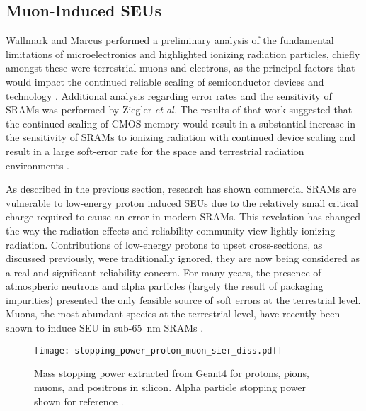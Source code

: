 \subsection{Muon-Induced SEUs} %
\label{sub:muon_induced_seus}
Wallmark and Marcus performed a preliminary analysis of the fundamental limitations of microelectronics and highlighted ionizing radiation particles, chiefly amongst these were terrestrial muons and electrons, as the principal factors that would impact the continued reliable scaling of semiconductor devices and technology \cite{Wallmark:1962vn}.
Additional analysis regarding error rates and the sensitivity of SRAMs was performed by Ziegler \emph{et al.}
The results of that work suggested that the continued scaling of CMOS memory would result in a substantial increase in the sensitivity of SRAMs to ionizing radiation with continued device scaling and result in a large soft-error rate for the space and terrestrial radiation environments \cite{Ziegler:1979vh}.

As described in the previous section, research has shown commercial SRAMs are vulnerable to low-energy proton induced SEUs due to the relatively small critical charge required to cause an error in modern SRAMs.
This revelation has changed the way the radiation effects and reliability community view lightly ionizing radiation.
Contributions of low-energy protons to upset cross-sections, as discussed previously, were traditionally ignored, they are now being considered as a real and significant reliability concern.
For many years, the presence of atmospheric neutrons and alpha particles (largely the result of packaging impurities) presented the only feasible source of soft errors at the terrestrial level.
Muons, the most abundant species at the terrestrial level, have recently been shown to induce SEU in sub-65~nm SRAMs \cite{Sierawski:2010cj,Sierawski:2011tc,Sierawski:2011bn}.

\begin{figure}[tb]
    \begin{center}
        \texttt{[image: stopping\_power\_proton\_muon\_sier\_diss.pdf]}
    \end{center}
    \caption[Mass stopping power extracted from Geant4 for protons, pions, muons, and positrons in silicon. Alpha particle stopping power shown for reference.]{Mass stopping power extracted from Geant4 for protons, pions, muons, and positrons in silicon. Alpha particle stopping power shown for reference \cite{Sierawski:2011bn}.}
    \label{fig:stopping_power_protons_muons}
\end{figure}

